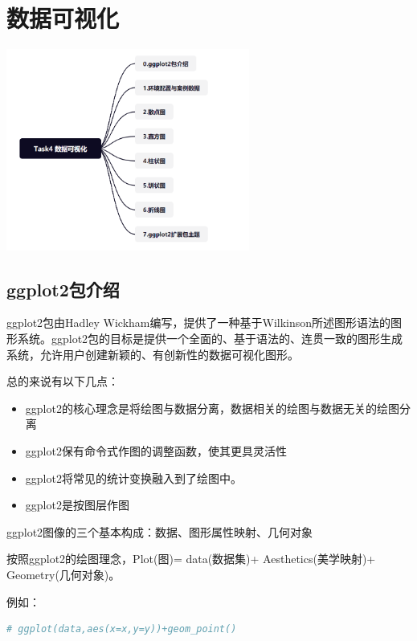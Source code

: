 \documentclass[]{ctexbook}
\providecommand{\tightlist}{%
  \setlength{\itemsep}{0pt}\setlength{\parskip}{0pt}}
\begin{document}
\hypertarget{task-04}{%
\section{数据可视化}\label{task-04}}

\includegraphics[width=0.6\textwidth,height=\textheight]{./image/task04_structure.png}

\hypertarget{ggplot2ux5305ux4ecbux7ecd}{%
\subsection*{ggplot2包介绍}\label{ggplot2ux5305ux4ecbux7ecd}}


ggplot2包由Hadley Wickham编写，提供了一种基于Wilkinson所述图形语法的图形系统。ggplot2包的目标是提供一个全面的、基于语法的、连贯一致的图形生成系统，允许用户创建新颖的、有创新性的数据可视化图形。

总的来说有以下几点：

\begin{itemize}
\tightlist
\item
  ggplot2的核心理念是将绘图与数据分离，数据相关的绘图与数据无关的绘图分离
\item
  ggplot2保有命令式作图的调整函数，使其更具灵活性
\item
  ggplot2将常见的统计变换融入到了绘图中。
\item
  ggplot2是按图层作图
\end{itemize}

ggplot2图像的三个基本构成：数据、图形属性映射、几何对象

按照ggplot2的绘图理念，Plot(图)= data(数据集)+ Aesthetics(美学映射)+ Geometry(几何对象)。

例如：

\begin{lstlisting}[language=R]
# ggplot(data,aes(x=x,y=y))+geom_point()
\end{lstlisting}
\end{document}
